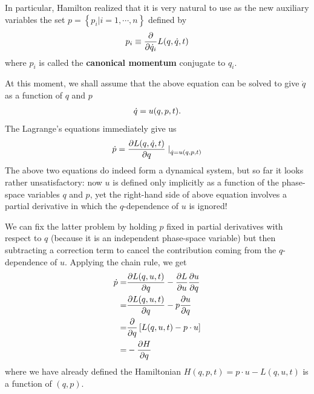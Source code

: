 \documentclass[letterpaper,10pt,english]{sphinxmanual}
\begin{document}
In particular, Hamilton realized that it is very natural to use as the
new auxiliary variables the set \(p=\left\{p_i|i=1,\cdots,n\right\}\) defined by
\begin{gather}
\begin{split}p_i\equiv\frac{\partial}{\partial \dot{q}_i}L(q,\dot{q},t)\end{split}\notag
\end{gather}
where \(p_i\) is called the \textbf{canonical momentum} conjugate
to \(q_i\).

At this moment, we shall assume that the above equation can be solved to give \(\dot{q}\) as a function of \(q\) and \(p\)
\begin{gather}
\begin{split}\dot{q}=u(q,p,t).\end{split}\notag
\end{gather}
The Lagrange's equations immediately give us
\begin{gather}
\begin{split}\dot{p}=\frac{\partial L(q,\dot{q},t)}{\partial q}\left.\right|_{\dot{q}=u(q,p,t)}\end{split}\notag
\end{gather}
The above two equations do indeed form a dynamical system, but so far it looks rather unsatisfactory: now \(u\) is defined only implicitly as a
function of the phase-space variables \(q\) and \(p\), yet the right-hand side of above equation involves a partial derivative in which the \(q\)-dependence of
\(u\) is ignored!

We can fix the latter problem by holding \(p\) fixed in partial derivatives
with respect to \(q\) (because it is an independent phase-space variable) but then subtracting a correction term to cancel the contribution coming from the \(q\)-dependence of \(u\). Applying the chain rule, we get
\begin{gather}
\begin{split}\dot{p}=&\frac{\partial L(q,u,t)}{\partial q}-\frac{\partial L}{\partial u}\frac{\partial u}{\partial q} \\
=&\frac{\partial L(q,u,t)}{\partial q}-p\frac{\partial u}{\partial q} \\
=&\frac{\partial}{\partial q}\left[L(q,u,t)-p\cdot u\right] \\
=&-\frac{\partial H}{\partial q}\end{split}\notag
\end{gather}
where we have already defined the Hamiltonian \(H(q, p, t)= p\cdot u − L(q,u, t)\) is a function of \((q, p)\).
\end{document}
